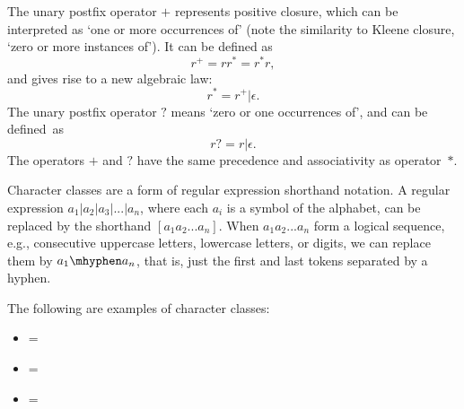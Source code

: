 The unary postfix operator \(+\) represents positive closure, which can be interpreted as `one or more occurrences of' (note the similarity to Kleene closure, `zero or more instances of'). It can be defined as
\[r^+ = rr^* = r^*r,\]
and gives rise to a new algebraic law:
\[r^* = r^+|\epsilon.\]
%
The unary postfix operator \(?\) means `zero or one
occurrences of', and can be defined~as
\[ r? = r|\epsilon. \]
%
The operators \(+\) and \(?\) have the same precedence and associativity as operator~\(*\).


Character classes are a form of regular expression shorthand notation. A regular expression \(a_1|a_2|a_3|...|a_n\), where each \(a_i\) is a symbol of the alphabet, can be replaced by the shorthand \([a_1 a_2...a_n]\).
When \(a_1 a_2...a_n\) form a logical sequence, e.g., consecutive uppercase letters, lowercase letters, or digits, we
can replace them by \(a_1\mhyphen a_n\), that is, just the first and last tokens separated by
a hyphen.


\begin{example}
The following are examples of character classes:
\begin{itemize}[]
\setlength\itemsep{1em}
\item \regex{[abc]} = 
\item \regex{[a\mhyphen z]} = 
\item {} = 
\end{itemize}
\end{example}

